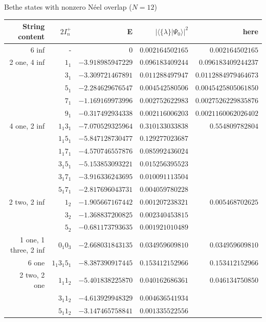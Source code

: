 \documentclass[11pt]{iopart}
\begin{document}
\begin{table}[h]
\scriptsize
\centering
Bethe states with nonzero N\'eel overlap ($N=12$)\\[1ex]
\begin{tabular}{rrrrr}
String content & $2I^+_n$ & E & $|\langle \{\lambda\}| \Psi_0 \rangle|^2$ & here \\[0.3em]
\toprule
6 inf & - & $0$ & $0.002164502165$ & $0.002164502165$ \\
\midrule
2 one, 4 inf &$1_1 $ & $-3.918985947229$ & $0.096183409244$ & $0.096183409244237$ \\
 &$3_1 $ & $-3.309721467891$ & $0.011288497947$ &  $0.0112884979464673$\\
 &$5_1 $ & $-2.284629676547$ & $0.004542580506$ &  $0.0045425805061850$\\
 &$7_1 $ & $-1.169169973996$ & $0.002752622983$ &  $0.0027526229835876$\\
 &$9_1 $ & $-0.317492934338$ & $0.002116006203$ &  $0.0021160062026402$\\
\midrule
4 one, 2 inf &$1_1 3_1 $ & $-7.070529325964$ & $0.310133033838$ &$ 0.554809782804$ \\
  &$1_1 5_1 $ & $-5.847128730477$ & $0.129277023687$ \\
  &$ 1_1 7_1$ & $-4.570746557876$ & $0.085992436024$ \\
  &$ 3_1 5_1$ & $-5.153853093221$ & $0.015256395523$ \\
  &$3_1 7_1 $ & $-3.916336243695$ & $0.010091113504$ \\
  &$5_1 7_1 $ & $-2.817696043731$ & $0.004059780228$ \\
  \midrule
2 two, 2 inf &$1_2 $ & $-1.905667167442$ & $0.001207238321$ & $0.005468702625$\\
  &$3_2 $ & $-1.368837200825$ & $0.002340453815$ \\
  &$5_2 $ & $-0.681173793635$ & $0.001921010489$ \\
    \midrule
1 one, 1 three, 2 inf &$0_1 0_3 $ & $-2.668031843135$ & $0.034959609810$ & $0.034959609810$ \\
    \midrule
6 one &$1_1 3_1 5_1 $ & $-8.387390917445$ & $0.153412152966$ & $0.153412152966$ \\
  \midrule
2 two, 2 one &$1_1 1_2 $ & $-5.401838225870$ & $0.040162686361$ & $0.046134750850$ \\
  &$3_1 1_2 $ & $-4.613929948329$ & $0.004636541934$ \\
  &$5_1 1_2 $ & $-3.147465758841$ & $0.001335522556$ \\

\end{tabular}
\end{table}
\end{document}
